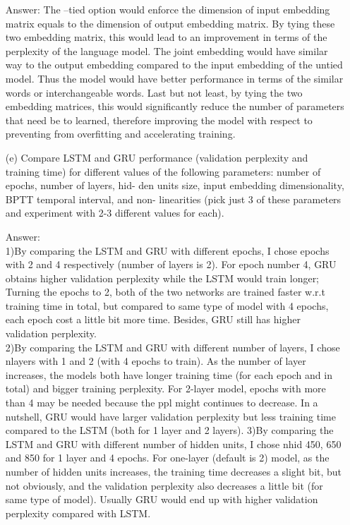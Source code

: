 \documentclass[12pt,letterpaper]{article}
\begin{document}
\begin{itemize}
    Answer: The --tied option would enforce the dimension of input embedding matrix equals to the dimension of output embedding matrix. By tying these two embedding matrix, this would lead to an improvement in terms of the perplexity of the language model. The joint embedding would have similar way to the output embedding compared to the input embedding of the untied model. Thus the model would have better performance in terms of the similar words or interchangeable words. Last but not least, by tying the two embedding matrices, this would significantly reduce the number of parameters that need be to learned, therefore improving the model with respect to preventing from overfitting and accelerating training.
    
    \item[(e)]Compare LSTM and GRU performance (validation perplexity and training time) for different values of the following parameters: number of epochs, number of layers, hid- den units size, input embedding dimensionality, BPTT temporal interval, and non- linearities (pick just 3 of these parameters and experiment with 2-3 different values for each).
    
    Answer: \\
    1)By comparing the LSTM and GRU with different epochs, I chose epochs with 2 and 4 respectively (number of layers is 2). For epoch number 4, GRU obtains higher validation perplexity while the LSTM would train longer; Turning the epochs to 2, both of the two networks are trained faster w.r.t training time in total, but compared to same type of model with 4 epochs, each epoch cost a little bit more time. Besides, GRU still has higher validation perplexity.\\
    2)By comparing the LSTM and GRU with different number of layers, I chose nlayers with 1 and 2 (with 4 epochs to train). As the number of layer increases, the models both have longer training time (for each epoch and in total) and bigger training perplexity. For 2-layer model, epochs with more than 4 may be needed because the ppl might continues to decrease. In a nutshell, GRU would have larger validation perplexity but less training time compared to the LSTM (both for 1 layer and 2 layers).
    3)By comparing the LSTM and GRU with different number of hidden units, I chose nhid 450, 650 and 850 for 1 layer and 4 epochs. For one-layer (default is 2) model, as the number of hidden units increases, the training time decreases a slight bit, but not obviously, and the validation perplexity also decreases a little bit (for same type of model). Usually GRU would end up with higher validation perplexity compared with LSTM.
    

\end{itemize}
\end{document}
